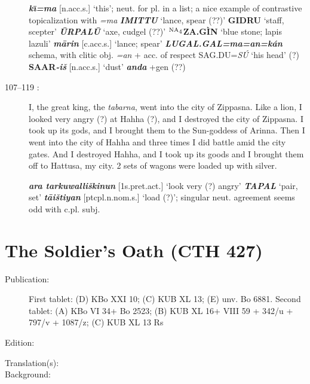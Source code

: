 \documentclass[10pt]{article}
\newcommand{\supersc}[1]{$^{\textrm{\scriptsize{#1}}}$}  	%
\newcommand{\subsc}[1]{$_{\textrm{\scriptsize{#1}}}$}	%
\newcommand{\bit}[1]{\textbf{\textit{#1}}}				%
\newcommand{\p}[1]{{\tiny[{#1}]}}					%
\newcommand{\I}{\={\i}}									%
\newcommand{\hith}{\textsubwedge{h}}
\newcommand{\Hith}{\textsubwedge{H}}
\newcommand{\stone}{\supersc{NA\subsc{4}}}
\renewcommand{\.}[1]{\textsubdot{#1}}
\begin{document}
\begin{description}
\begin{notes}

\bit{k\I=ma} \p{n.acc.s.} `this'; neut. for pl. in a list; a nice example of contrastive topicalization with \textit{=ma} \bit{IMITTU} `lance, spear (??)' \textbf{GIDRU} `staff, scepter' \bit{{\Hith}\=URPAL\=U} `axe, cudgel (??)' \textbf{{\stone}ZA.G\`IN} `blue stone; lapis lazuli' \bit{m\=arin} \p{c.acc.s.} `lance; spear' \bit{LUGAL.GAL=ma=an=k\'an} schema, with clitic obj. \textit{=an} + acc. of respect SAG.DU=\textit{S\'U} `his head' (?) \textbf{SA{\Hith}AR}\bit{-i\v{s}} \p{n.acc.s.} `dust' \bit{anda} +gen (??)

\end{notes}


\item[107--119 :] I, the great king, the \textit{tabarna}, went into the city of Zippasna. Like a lion, I looked very angry (?) at Hahha (?), and I destroyed the city of Zippasna. I took up its gods, and I brought them to the Sun-goddess of Arinna. Then I went into the city of Hahha and three times I did battle amid the city gates. And I destroyed Hahha, and I took up its goods and I brought them off to Hattusa, my city. 2 sets of wagons were loaded up with silver.


\begin{notes}

\bit{ar{\hith}a tarkuwalli\v{s}kinun} \p{1s.pret.act.} `look very (?) angry' \bit{TAPAL} `pair, set' \bit{t\=ai\v{s}tiyan} \p{ptcpl.n.nom.s.} `load (?)'; singular neut. agreement seems odd with c.pl. subj.

\end{notes}

\end{description}


\section{The Soldier's Oath (CTH 427)}

\begin{description}

\item[Publication:] First tablet: (D) KBo XXI 10; (C) KUB XL 13; (E) unv. Bo 6881. Second tablet: (A) KBo VI 34+ Bo 2523; (B) KUB XL 16+ VIII 59 + 342/u + 797/v + 1087/z; (C) KUB XL 13 Rs
\item[Edition:] \citet{oettinger1976eide}
\item[Translation(s):] 
\item[Background:] 

\end{description}
\end{document}
